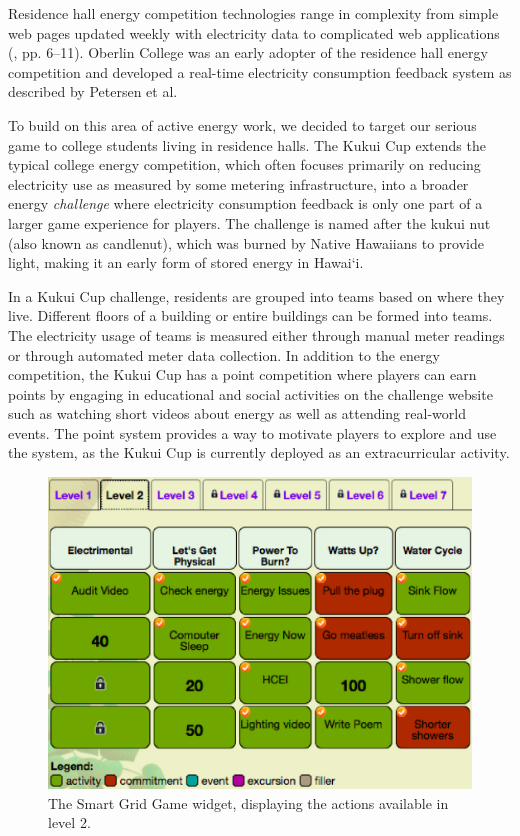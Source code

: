 \documentclass{sigchi}
\newcommand{\Hawaii}{Hawai`i\xspace}
\begin{document}
Residence hall energy competition technologies range in complexity from simple web pages updated weekly with electricity data to complicated web applications (\cite{csdl2-11-01}, pp. 6--11). Oberlin College was an early adopter of the residence hall energy competition and developed a real-time electricity consumption feedback system as described by Petersen et al.~\cite{petersen-dorm-energy-reduction}

To build on this area of active energy work, we decided to target our serious game to college students living in residence halls. The Kukui Cup extends the typical college energy competition, which often focuses primarily on reducing electricity use as measured by some metering infrastructure, into a broader energy \emph{challenge} where electricity consumption feedback is only one part of a larger game experience for players. The challenge is named after the kukui nut (also known as candlenut), which was burned by Native Hawaiians to provide light, making it an early form of stored energy in \Hawaii.

In a Kukui Cup challenge, residents are grouped into teams based on where they live. Different floors of a building or entire buildings can be formed into teams. The electricity usage of teams is measured either through manual meter readings or through automated meter data collection. In addition to the energy competition, the Kukui Cup has a point competition where players can earn points by engaging in educational and social activities on the challenge website such as watching short videos about energy as well as attending real-world events. The point system provides a way to motivate players to explore and use the system, as the Kukui Cup is currently deployed as an extracurricular activity.

\begin{figure}[!tb]
	\centering
	\includegraphics[width=0.95\columnwidth]{smart-grid2.eps}
	\caption{The Smart Grid Game widget, displaying the actions available in level 2.}
	\label{fig:smart-grid}
\end{figure}
\end{document}
